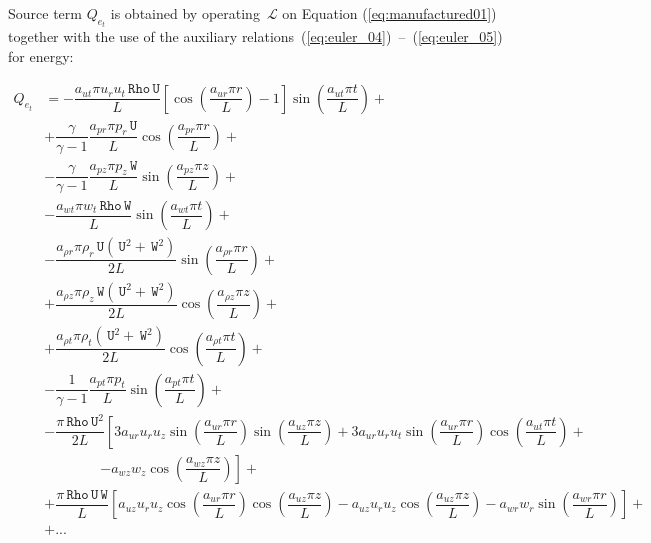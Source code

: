 \documentclass[10pt]{article}
\newcommand{\Lo}{\,\mathcal{L}}
\newcommand{\Rho}{\,\mathtt{Rho}}
\newcommand{\U}{\,\mathtt{U}}
\newcommand{\W}{\,\mathtt{W}}
\begin{document}
Source term $Q_{e_t}$ is obtained by operating $\Lo$ on Equation  (\ref{eq:manufactured01}) together with the use of the  auxiliary relations~(\ref{eq:euler_04})~--~(\ref{eq:euler_05}) for energy:

\begin{equation*}
 \begin{split}
 \displaystyle
Q_{e_t} &= -\dfrac{a_{ut} \pi u_r u_t \Rho \U }{L}\left[\cos\left(\dfrac{a_{ur} \pi r}{L}\right)-1\right] \sin\left(\dfrac{a_{ut} \pi t}{L}\right)+ \\
&+\dfrac{\gamma  }{\gamma-1}\dfrac{a_{pr} \pi p_r \U}{L}\cos\left(\dfrac{a_{pr} \pi r}{L}\right)+\\
&-\dfrac{\gamma }{\gamma-1}\dfrac{a_{pz} \pi p_z \W }{L}\sin\left(\dfrac{a_{pz} \pi z}{L}\right)+\\
&-\dfrac{a_{wt} \pi w_t \Rho \W }{L}\sin\left(\dfrac{a_{wt} \pi t}{L}\right)+ \\
&-\dfrac{a_{\rho r} \pi \rho_r \U  (\U^2+\W^2) }{2L} \sin\left(\dfrac{a_{\rho r} \pi r}{L}\right) + \\
&+\dfrac{ a_{\rho z}\pi \rho_z \W (\U^2+\W^2) }{2L}\cos\left(\dfrac{a_{\rho z} \pi z}{L}\right) + \\
&+\dfrac{ a_{\rho t} \pi \rho_t (\U^2+\W^2)}{2L}\cos\left(\dfrac{a_{\rho t} \pi t}{L}\right)+ \\
&-\dfrac{1}{\gamma-1}\dfrac{a_{pt} \pi p_t }{L}\sin\left(\dfrac{a_{pt} \pi t}{L}\right)+\\
&-\dfrac{\pi \Rho \U^2}{2L} \left[3 a_{ur} u_r u_z \sin\left(\dfrac{a_{ur} \pi r}{L}\right) \sin\left(\dfrac{a_{uz} \pi z}{L}\right)+3 a_{ur} u_r u_t \sin\left(\dfrac{a_{ur} \pi r}{L}\right) \cos\left(\dfrac{a_{ut} \pi t}{L}\right)\right.+\\
    &\qquad\qquad\left.-a_{wz} w_z \cos\left(\dfrac{a_{wz} \pi z}{L}\right)\right] + \\
&+\dfrac{\pi \Rho \U \W}{L}\left[ a_{uz} u_r u_z \cos\left(\dfrac{a_{ur} \pi r}{L}\right) \cos\left(\dfrac{a_{uz} \pi z}{L}\right)-a_{uz} u_r u_z \cos\left(\dfrac{a_{uz} \pi z}{L}\right)-a_{wr} w_r \sin\left(\dfrac{a_{wr} \pi r}{L}\right)\right] + \\
&+...\\
\end{split}
\end{equation*}
\end{document}
